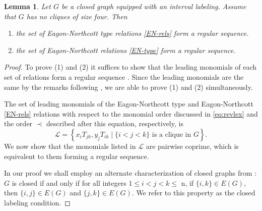 \documentclass[reqno]{amsart}
\newtheorem{lemma}[thm]{Lemma}
\theoremstyle{definition}
\theoremstyle{remark}
\numberwithin{equation}{section}
\begin{document}
\begin{lemma}\label{lem: coprime}
Let $G$ be a closed graph equipped with an interval labeling. Assume that $G$ has no cliques of size four. Then
\begin{enumerate}[nosep]
\item the set of Eagon-Northcott type relations \eqref{EN-rels} form a regular sequence.
\item the set of Eagon-Northcott relations \eqref{EN-type} form a regular sequence.
\end{enumerate}
\end{lemma}
\begin{proof}
To prove (1) and (2)  it suffices to show that the leading monomials of each set of relations form a regular sequence \cite{reg_sequence_ref}. Since the leading monomials are the same by the remarks following , 
we  are able to prove (1) and (2) simultaneously.

The set of leading monomials of the  Eagon-Northcott type and Eagon-Northcott \eqref{EN-rels}  relations with respect to the monomial order discussed in \eqref{eq:revlex} and the order $\prec$ described after this equation, respectively,
is  
\[
\mathcal{L}=\left \{x_iT_{jk}, y_j T_{ik} \mid \{i<j<k\} \text{ is a clique  in } G \right \}.
\]
We now show that the monomials listed in $\mathcal{L}$ are pairwise coprime, which is equivalent to them forming a regular sequence.

In our proof we shall employ an alternate characterization of closed graphs from \cite[Proposition 4.8]{CrupiRinaldo}: $G$ is closed if and only if for all integers $1 \leq i < j < k \leq$ n, if $\{i,k\}\in E(G)$, then $\{i,j\}\in E(G)$ and $\{j,k\}\in E(G)$. We refer to this property as the closed labeling condition.


\end{proof}
\end{document}
